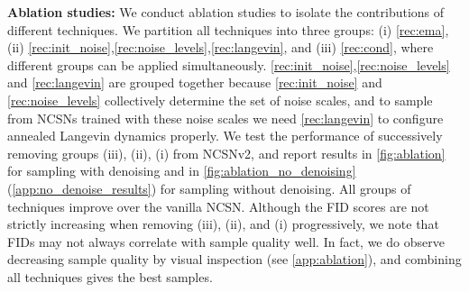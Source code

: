 \documentclass{article}
\begin{document}
\textbf{Ablation studies:} We conduct ablation studies to isolate the contributions of different techniques. We partition all techniques into three groups: (i) \cref{rec:ema}, (ii) \cref{rec:init_noise},\ref{rec:noise_levels},\ref{rec:langevin}, and (iii) \cref{rec:cond}, where different groups can be applied simultaneously. \cref{rec:init_noise},\ref{rec:noise_levels} and \ref{rec:langevin} are grouped together because \cref{rec:init_noise} and \ref{rec:noise_levels} collectively determine the set of noise scales, and to sample from NCSNs trained with these noise scales we need \cref{rec:langevin} to configure annealed Langevin dynamics properly. We test the performance of successively removing groups (iii), (ii), (i) from NCSNv2, and report results in \cref{fig:ablation} for sampling with denoising and in \cref{fig:ablation_no_denoising} (\cref{app:no_denoise_results}) for sampling without denoising. All groups of techniques improve over the vanilla NCSN. Although the FID scores are not strictly increasing when removing (iii), (ii), and (i) progressively, we note that FIDs may not always correlate with sample quality well. In fact, we do observe decreasing sample quality by visual inspection (see \cref{app:ablation}), and combining all techniques gives the best samples.
\end{document}
